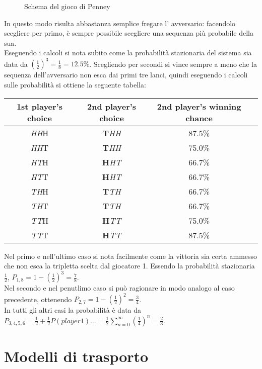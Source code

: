\documentclass[12pt, a4paper]{book}
\theoremstyle{theorem}
\begin{document}
\begin{figure}
\begin{tikzpicture}[x=0.75pt,y=0.75pt,yscale=-1,xscale=1]
					\end{tikzpicture}
					\caption{Schema del gioco di Penney}
					\label{Penney's scheme}
				\end{figure}
				In questo modo risulta abbastanza semplice fregare l' avversario: facendolo scegliere per primo, è sempre possibile scegliere una sequenza più probabile della sua.\\
				Eseguendo i calcoli si nota subito come la probabilità stazionaria del sistema sia data da $\left(\frac{1}{2}\right)^3=\frac{1}{8}=12.5\%$.
				Scegliendo per secondi si vince sempre a meno che la sequenza dell'avversario non esca dai primi tre lanci, quindi eseguendo i calcoli sulle probabilità si ottiene la seguente tabella:
				\begin{center}
					\begin{tabular}{ |c|c|c|c| } 
						\hline
						1st player's choice& 2nd player's choice & 2nd player's winning chance\\
						\hline
						\emph{HH}H & \textbf{T}\emph{HH} & 87.5\% \\
						\emph{HH}T & \textbf{T}\emph{HH} & 75.0\% \\
						\emph{HT}H & \textbf{H}\emph{HT} & 66.7\% \\
						\emph{HT}T & \textbf{H}\emph{HT} & 66.7\% \\
						\emph{TH}H & \textbf{T}\emph{TH} & 66.7\% \\
						\emph{TH}T & \textbf{T}\emph{TH} & 66.7\% \\
						\emph{TT}H & \textbf{H}\emph{TT} & 75.0\% \\
						\emph{TT}T & \textbf{H}\emph{TT} & 87.5\% \\
						\hline
					\end{tabular}
				\end{center}
				Nel primo e nell'ultimo caso si nota facilmente come la vittoria sia certa ammesso che non esca la tripletta scelta dal giocatore 1.
				Essendo la probabilità stazionaria $\frac{1}{2}$, $P_{1,8}=1-\left(\frac{1}{2}\right)^3=\frac{7}{8}$.\\
				Nel secondo e nel penutlimo caso si può ragionare in modo analogo al caso precedente, ottenendo $P_{2,7}=1-\left(\frac{1}{2}\right)^2=\frac{3}{4}$.\\
				In tutti gli altri casi la probabilità è data da $P_{3,4,5,6}=\frac{1}{2}+\frac{1}{2}P(player1)\ldots=\frac{1}{2}\sum_{n=0}^\infty\left(\frac{1}{4}\right)^n=\frac{2}{3}$.

	\chapter{Modelli di trasporto} %
\end{document}
